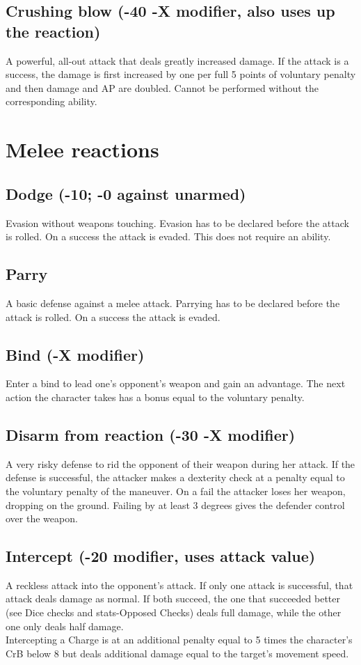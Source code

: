 \documentclass[12pt,a4paper,openany]{book}
\begin{document}
	\subsection*{Crushing blow (-40 -X modifier, also uses up the reaction)}
	A powerful, all-out attack that deals greatly increased damage. If the attack is a success, the damage is first increased by one per full 5 points of voluntary penalty and then damage and AP are doubled. Cannot be performed without the corresponding ability.
	\section{Melee reactions}
	\subsection*{Dodge (-10; -0 against unarmed)}
	Evasion without weapons touching. Evasion has to be declared before the attack is rolled. On a success the attack is evaded. This does not require an ability.
	\subsection*{Parry}
	A basic defense against a melee attack. Parrying has to be declared before the attack is rolled. On a success the attack is evaded.
	\subsection*{Bind (-X modifier)}
	Enter a bind to lead one’s opponent’s weapon and gain an advantage. The next action the character takes has a bonus equal to the voluntary penalty.
	\subsection*{Disarm from reaction (-30 -X modifier)}
	A very risky defense to rid the opponent of their weapon during her attack. If the defense is successful, the attacker makes a dexterity check at a penalty equal to the voluntary penalty of the maneuver. On a fail the attacker loses her weapon, dropping on the ground. Failing by at least 3 degrees gives the defender control over the weapon.
	\subsection*{Intercept (-20 modifier, uses attack value)}
	A reckless attack into the opponent's attack. If only one attack is successful, that attack deals damage as normal. If both succeed, the one that succeeded better (see Dice checks and stats-Opposed Checks) deals full damage, while the other one only deals half damage.\\
	Intercepting a Charge is at an additional penalty equal to 5 times the character’s CrB below 8 but deals additional damage equal to the target’s movement speed.
\end{document}
